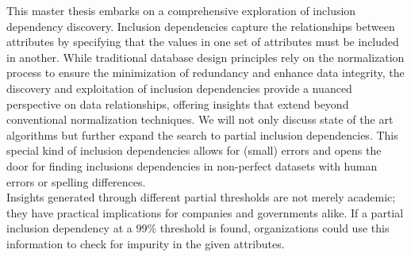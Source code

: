 \noindent This master thesis embarks on a comprehensive exploration of inclusion dependency discovery. Inclusion dependencies capture the relationships between attributes by specifying that the values in one set of attributes must be included in another. While traditional database design principles rely on the normalization process to ensure the minimization of redundancy and enhance data integrity, the discovery and exploitation of inclusion dependencies provide a nuanced perspective on data relationships, offering insights that extend beyond conventional normalization techniques. We will not only discuss state of the art algorithms but further expand the search to partial inclusion dependencies. This special kind of inclusion dependencies allows for (small) errors and opens the door for finding inclusions dependencies in non-perfect datasets with human errors or spelling differences. \\

\noindent Insights generated through different partial thresholds are not merely academic; they have practical implications for companies and governments alike. If a partial inclusion dependency at a $99\%$ threshold is found, organizations could use this information to check for impurity in the given attributes.

